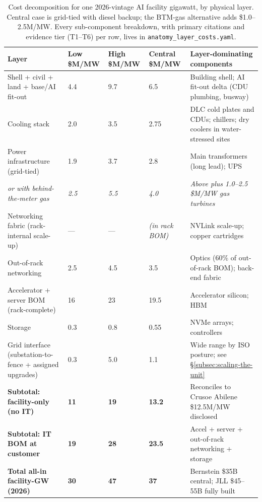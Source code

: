 \begin{table}[h]
\centering
\small
\begin{tabular}{@{}L{4.6cm}R{1.5cm}R{1.5cm}R{1.6cm}L{4.4cm}@{}}
\toprule
\textbf{Layer} & \textbf{Low \$M/MW} & \textbf{High \$M/MW} & \textbf{Central \$M/MW} & \textbf{Layer-dominating components} \\
\midrule
Shell + civil + land + base/AI fit-out & 4.4 & 9.7 & 6.5 & Building shell; AI fit-out delta (CDU plumbing, busway) \\
Cooling stack & 2.0 & 3.5 & 2.75 & DLC cold plates and CDUs; chillers; dry coolers in water-stressed sites \\
Power infrastructure (grid-tied) & 1.9 & 3.7 & 2.8 & Main transformers (long lead); UPS \\
\quad\emph{or with behind-the-meter gas} & \emph{2.5} & \emph{5.5} & \emph{4.0} & \emph{Above plus 1.0--2.5 \$M/MW gas turbines} \\
Networking fabric (rack-internal scale-up) & --- & --- & \emph{(in rack BOM)} & NVLink scale-up; copper cartridges \\
Out-of-rack networking & 2.5 & 4.5 & 3.5 & Optics (60\% of out-of-rack BOM); back-end fabric \\
Accelerator + server BOM (rack-complete) & 16 & 23 & 19.5 & Accelerator silicon; HBM \\
Storage & 0.3 & 0.8 & 0.55 & NVMe arrays; controllers \\
Grid interface (substation-to-fence + assigned upgrades) & 0.3 & 5.0 & 1.1 & Wide range by ISO posture; see \S\ref{subsec:scaling-the-unit} \\
\midrule
\textbf{Subtotal: facility-only (no IT)} & \textbf{11} & \textbf{19} & \textbf{13.2} & Reconciles to Crusoe Abilene \$12.5M/MW disclosed \\
\textbf{Subtotal: IT BOM at customer} & \textbf{19} & \textbf{28} & \textbf{23.5} & Accel + server + out-of-rack networking + storage \\
\textbf{Total all-in facility-GW (2026)} & \textbf{30} & \textbf{47} & \textbf{37} & Bernstein \$35B central; JLL \$45--55B fully built \\
\bottomrule
\end{tabular}
\caption{Cost decomposition for one 2026-vintage AI facility gigawatt, by physical layer. Central case is grid-tied with diesel backup; the BTM-gas alternative adds \$1.0--2.5M/MW. Every sub-component breakdown, with primary citations and evidence tier (T1--T6) per row, lives in \texttt{anatomy\_layer\_costs.yaml}.}
\label{tab:layer-bom}
\end{table}

